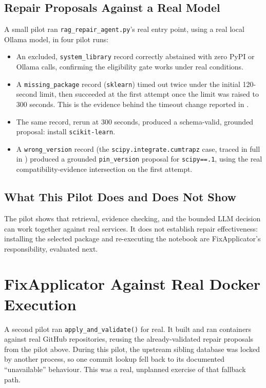 \subsection{Repair Proposals Against a Real Model}

A small pilot ran \texttt{rag\_repair\_agent.py}'s real entry point, using a
real local Ollama model, in four pilot runs:

\begin{itemize}
  \item An excluded, \texttt{system\_library} record correctly abstained
        with zero PyPI or Ollama calls, confirming the eligibility gate
        works under real conditions.
  \item A \texttt{missing\_package} record (\texttt{sklearn}) timed out
        twice under the initial 120-second limit, then succeeded at the
        first attempt once the limit was raised to 300 seconds. This is
        the evidence behind the timeout change reported in
        .
  \item The same record, rerun at 300 seconds, produced a schema-valid,
        grounded proposal: install \texttt{scikit-learn}.
  \item A \texttt{wrong\_version} record (the \texttt{scipy.integrate.cumtrapz}
        case, traced in full in
        ) produced a grounded
        \texttt{pin\_version} proposal for \texttt{scipy==.1}, using the
        real compatibility-evidence intersection on the first attempt.
\end{itemize}

\subsection{What This Pilot Does and Does Not Show}

The pilot shows that retrieval, evidence checking, and the bounded LLM
decision can work together against real services. It does not establish
repair effectiveness: installing the selected package and re-executing the
notebook are FixApplicator's responsibility, evaluated next.

\section{FixApplicator Against Real Docker Execution}
\label{sec:v-i5}

A second pilot ran \texttt{apply\_and\_validate()} for real. It built and
ran containers against real GitHub repositories, reusing the
already-validated repair proposals from the pilot above. During this
pilot, the upstream sibling database was locked by another process, so
one commit lookup fell back to its documented ``unavailable'' behaviour.
This was a real, unplanned exercise of that fallback path.

